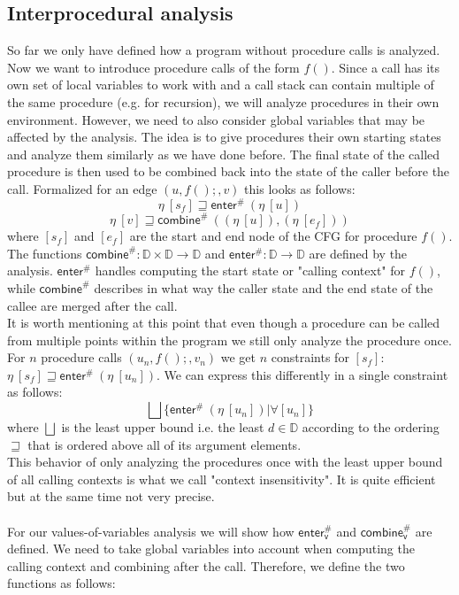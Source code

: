     \subsection{Interprocedural analysis}
    So far we only have defined how a program without procedure calls is analyzed. Now we want to introduce procedure calls of the form $f()$. Since a call has its own set of local variables to work with and a call stack can contain multiple of the same procedure (e.g. for recursion), we will analyze procedures in their own environment. However, we need to also consider global variables that may be affected by the analysis. The idea is to give procedures their own starting states and analyze them similarly as we have done before. The final state of the called procedure is then used to be combined back into the state of the caller before the call. Formalized for an edge $(u, f();, v)$ this looks as follows:
    \[\eta\ [s_f] \sqsupseteq \textsf{enter}^{\#}\ (\eta\ [u]) \]
    \[\eta\ [v] \sqsupseteq  \textsf{combine}^{\#}\ ((\eta\ [u]), (\eta\ [e_f])) \]
    where $[s_f]$ and $[e_f]$ are the start and end node of the \ac{CFG} for procedure $f()$. The functions $\textsf{combine}^{\#}: \mathbb{D} \times \mathbb{D} \rightarrow \mathbb{D}$ and $\textsf{enter}^{\#}: \mathbb{D} \rightarrow \mathbb{D}$ are defined by the analysis. $\textsf{enter}^{\#}$ handles computing the start state or "calling context" for $f()$, while $\textsf{combine}^{\#}$ describes in what way the caller state and the end state of the callee are merged after the call.\\
    It is worth mentioning at this point that even though a procedure can be called from multiple points within the program we still only analyze the procedure once. For $n$ procedure calls $(u_n, f();, v_n)$ we get $n$ constraints for $[s_f]$: $\eta\ [s_f] \sqsupseteq \textsf{enter}^{\#}\ (\eta\ [u_n])$. We can express this differently in a single constraint as follows:
    \[ \bigsqcup \{ \textsf{enter}^{\#}\ (\eta\ [u_n]) | \forall [u_n] \}\]
    where $\bigsqcup$ is the least upper bound i.e. the least $d \in \mathbb{D}$ according to the ordering $\sqsupseteq$ that is ordered above all of its argument elements.\\
    This behavior of only analyzing the procedures once with the least upper bound of all calling contexts is what we call "context insensitivity". It is quite efficient but at the same time not very precise.\\ 
    \\
    For our values-of-variables analysis we will show how $\textsf{enter}^{\#}_\textsf{v}$ and $\textsf{combine}^{\#}_\textsf{v}$ are defined. We need to take global variables into account when computing the calling context and combining after the call. Therefore, we define the two functions as follows:
